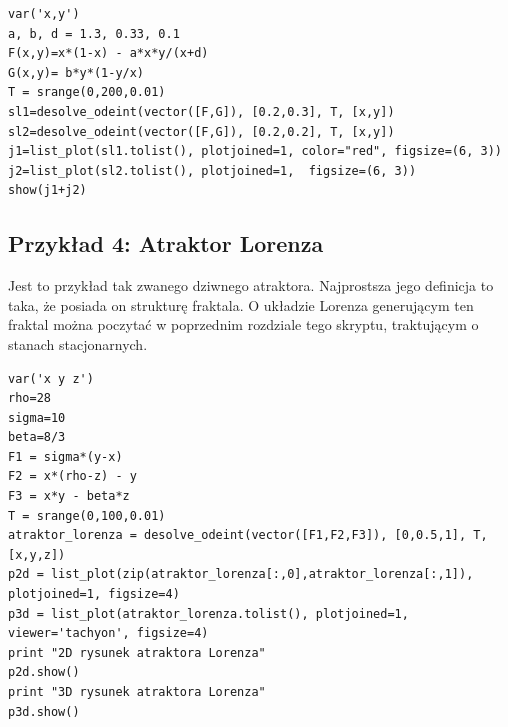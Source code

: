 \documentclass[a4paper,12pt,polish]{sphinxmanual}
\begin{document}
\begin{verbatim}
var('x,y')
a, b, d = 1.3, 0.33, 0.1
F(x,y)=x*(1-x) - a*x*y/(x+d)
G(x,y)= b*y*(1-y/x)
T = srange(0,200,0.01)
sl1=desolve_odeint(vector([F,G]), [0.2,0.3], T, [x,y])
sl2=desolve_odeint(vector([F,G]), [0.2,0.2], T, [x,y])
j1=list_plot(sl1.tolist(), plotjoined=1, color="red", figsize=(6, 3))
j2=list_plot(sl2.tolist(), plotjoined=1,  figsize=(6, 3))
show(j1+j2)
\end{verbatim}



\subsection{Przykład 4: Atraktor Lorenza}
\label{ch1/chI024:przyklad-4-atraktor-lorenza}
Jest to przykład tak zwanego dziwnego atraktora. Najprostsza jego definicja to taka, że posiada on strukturę fraktala. O układzie Lorenza generującym ten fraktal można poczytać w poprzednim rozdziale tego skryptu, traktującym o stanach stacjonarnych.


\begin{verbatim}
var('x y z')
rho=28
sigma=10
beta=8/3
F1 = sigma*(y-x)
F2 = x*(rho-z) - y
F3 = x*y - beta*z
T = srange(0,100,0.01)
atraktor_lorenza = desolve_odeint(vector([F1,F2,F3]), [0,0.5,1], T, [x,y,z])
p2d = list_plot(zip(atraktor_lorenza[:,0],atraktor_lorenza[:,1]), plotjoined=1, figsize=4)
p3d = list_plot(atraktor_lorenza.tolist(), plotjoined=1, viewer='tachyon', figsize=4)
print "2D rysunek atraktora Lorenza"
p2d.show()
print "3D rysunek atraktora Lorenza"
p3d.show()
\end{verbatim}
\end{document}
